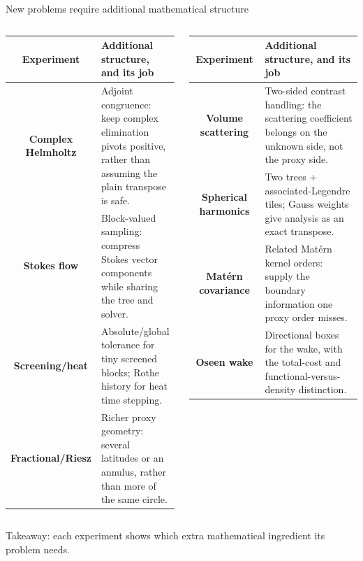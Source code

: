 \documentclass[aspectratio=169,11pt]{beamer}
\begin{document}
\begin{frame}{New problems require additional mathematical structure}
\scriptsize
\begin{columns}[T]
 \begin{tabularx}{\linewidth}{@{}c>{\raggedright\arraybackslash}X@{}}
 \textbf{Experiment} & \textbf{Additional structure, and its job}\\
 \midrule
 \textbf{Complex Helmholtz} & Adjoint congruence: keep complex elimination pivots positive, rather than assuming the plain transpose is safe.\\
 \addlinespace[1.4mm]
 \textbf{Stokes flow} & Block-valued sampling: compress Stokes vector components while sharing the tree and solver.\\
 \addlinespace[1.4mm]
 \textbf{Screening/heat} & Absolute/global tolerance for tiny screened blocks; Rothe history for heat time stepping.\\
 \addlinespace[1.4mm]
 \textbf{Fractional/Riesz} & Richer proxy geometry: several latitudes or an annulus, rather than more of the same circle.\\
 \end{tabularx}
 
 \begin{tabularx}{\linewidth}{@{}c>{\raggedright\arraybackslash}X@{}}
 \textbf{Experiment} & \textbf{Additional structure, and its job}\\
 \midrule
 \textbf{Volume scattering} & Two-sided contrast handling: the scattering coefficient belongs on the unknown side, not the proxy side.\\
 \addlinespace[1.4mm]
 \textbf{Spherical harmonics} & Two trees + associated-Legendre tiles; Gauss weights give analysis as an exact transpose.\\
 \addlinespace[1.4mm]
 \textbf{Matérn covariance} & Related Matérn kernel orders: supply the boundary information one proxy order misses.\\
 \addlinespace[1.4mm]
 \textbf{Oseen wake} & Directional boxes for the wake, with the total-cost and functional-versus-density distinction.\\
 \end{tabularx}
\end{columns}
\vspace{2mm}
\small Takeaway: each experiment shows which extra mathematical ingredient its problem needs.
\end{frame}
\end{document}
